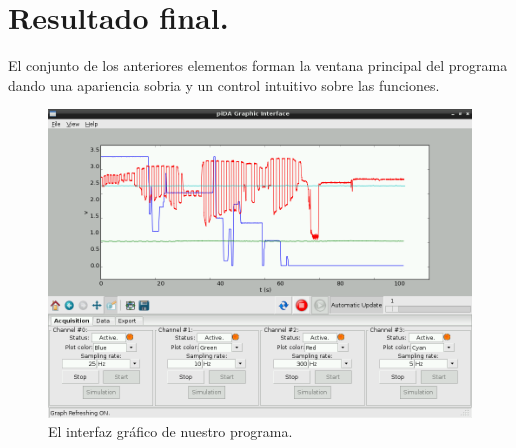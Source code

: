 \section{Resultado final.}
El conjunto de los anteriores elementos forman la ventana principal del programa dando una apariencia sobria y un control intuitivo sobre las funciones.
\begin{figure}[h]
  \centering
  \includegraphics[width=1\textwidth]{img/pida_4ch_sample.png}
  \caption{El interfaz gráfico de nuestro programa.}
  \label{fig:gui-full_sample}
\end{figure}	